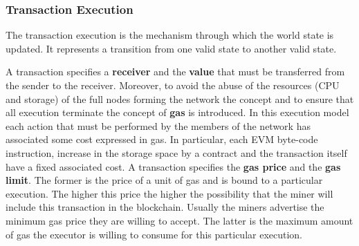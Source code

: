\subsubsection{Transaction Execution}
\label{sec:tx-execution}
The transaction execution is the mechanism through which the world state is
updated. It represents a transition from one
valid state to another valid state.

A transaction specifies a \textbf{receiver} and the \textbf{value} that must be
transferred from the sender to the receiver.
Moreover, to avoid the abuse of the resources
(CPU and storage) of the full nodes forming the network the concept and to
ensure that all execution terminate the concept of \textbf{gas} is introduced.
In this execution model each action that must be performed by the members
of the network has associated some cost expressed in gas.
In particular, each EVM byte-code instruction, increase in the storage
space by a contract and the transaction itself have a fixed associated cost.
A transaction specifies the \textbf{gas price} and the \textbf{gas limit}. 
The former is the price of a unit of gas and is bound to a particular execution.
The higher this price the higher the
possibility that the miner will include this transaction in the blockchain.
Usually the miners advertise the minimum gas price they are willing to accept.
The latter is the maximum amount of gas the executor is willing to consume for
this particular execution.

